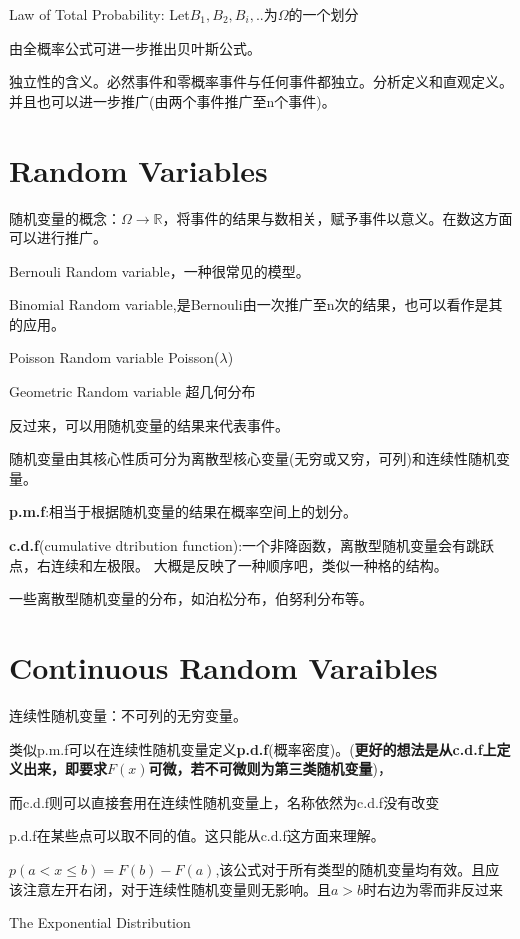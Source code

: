 \documentclass[12pt,a4paper]{ctexart}
\begin{document}
Law of Total Probability: Let$ B_{1},B_{2},B_{i},.. $为$ \Omega $的一个划分

由全概率公式可进一步推出贝叶斯公式。

独立性的含义。必然事件和零概率事件与任何事件都独立。分析定义和直观定义。并且也可以进一步推广(由两个事件推广至n个事件)。

\section{Random Variables}
随机变量的概念：$ \Omega \rightarrow \mathbb{R}  $，将事件的结果与数相关，赋予事件以意义。在数这方面可以进行推广。

Bernouli Random variable，一种很常见的模型。

Binomial Random variable,是Bernouli由一次推广至n次的结果，也可以看作是其的应用。

Poisson Random variable Poisson($ \lambda $)

Geometric Random variable 超几何分布

反过来，可以用随机变量的结果来代表事件。

随机变量由其核心性质可分为离散型核心变量(无穷或又穷，可列)和连续性随机变量。

\textbf{p.m.f}:相当于根据随机变量的结果在概率空间上的划分。

\textbf{c.d.f}(cumulative dtribution function):一个非降函数，离散型随机变量会有跳跃点，右连续和左极限。
大概是反映了一种顺序吧，类似一种格的结构。

一些离散型随机变量的分布，如泊松分布，伯努利分布等。


\section{Continuous Random Varaibles}
连续性随机变量：不可列的无穷变量。

类似p.m.f可以在连续性随机变量定义\textbf{p.d.f}(概率密度)。(\textbf{更好的想法是从c.d.f上定义出来，即要求$ F(x) $可微，若不可微则为第三类随机变量})，


而c.d.f则可以直接套用在连续性随机变量上，名称依然为c.d.f没有改变

p.d.f在某些点可以取不同的值。这只能从c.d.f这方面来理解。

$ p( a < x\leq b) =F\left( b\right) -F\left( a\right)  $,该公式对于所有类型的随机变量均有效。且应该注意左开右闭，对于连续性随机变量则无影响。且$ a > b $时右边为零而非反过来

The Exponential Distribution
\end{document}
